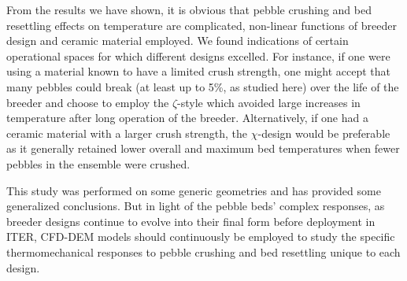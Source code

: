 From the results we have shown, it is obvious that pebble crushing and bed resettling effects on temperature are complicated, non-linear functions of breeder design and ceramic material employed. We found indications of certain operational spaces for which different designs excelled. For instance, if one were using a material known to have a limited crush strength, one might accept that many pebbles could break (at least up to 5\%, as studied here) over the life of the breeder and choose to employ the $\zeta$-style which avoided large increases in temperature after long operation of the breeder. Alternatively, if one had a ceramic material with a larger crush strength, the $\chi$-design would be preferable as it generally retained lower overall and maximum bed temperatures when fewer pebbles in the ensemble were crushed.

This study was performed on some generic geometries and has provided some generalized conclusions. But in light of the pebble beds' complex responses, as breeder designs continue to evolve into their final form before deployment in ITER, CFD-DEM models should continuously be employed to study the specific thermomechanical responses to pebble crushing and bed resettling unique to each design.










